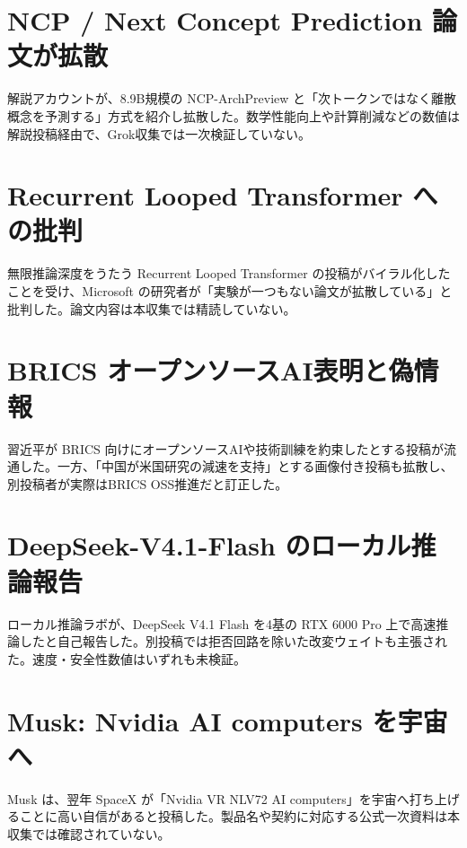 \section{NCP / Next Concept Prediction 論文が拡散}
解説アカウントが、8.9B規模の NCP-ArchPreview と「次トークンではなく離散概念を予測する」方式を紹介し拡散した。数学性能向上や計算削減などの数値は解説投稿経由で、Grok収集では一次検証していない。

\section{Recurrent Looped Transformer への批判}
無限推論深度をうたう Recurrent Looped Transformer の投稿がバイラル化したことを受け、Microsoft の研究者が「実験が一つもない論文が拡散している」と批判した。論文内容は本収集では精読していない。

\section{BRICS オープンソースAI表明と偽情報}
習近平が BRICS 向けにオープンソースAIや技術訓練を約束したとする投稿が流通した。一方、「中国が米国研究の減速を支持」とする画像付き投稿も拡散し、別投稿者が実際はBRICS OSS推進だと訂正した。

\section{DeepSeek-V4.1-Flash のローカル推論報告}
ローカル推論ラボが、DeepSeek V4.1 Flash を4基の RTX 6000 Pro 上で高速推論したと自己報告した。別投稿では拒否回路を除いた改変ウェイトも主張された。速度・安全性数値はいずれも未検証。

\section{Musk: Nvidia AI computers を宇宙へ}
Musk は、翌年 SpaceX が「Nvidia VR NLV72 AI computers」を宇宙へ打ち上げることに高い自信があると投稿した。製品名や契約に対応する公式一次資料は本収集では確認されていない。

